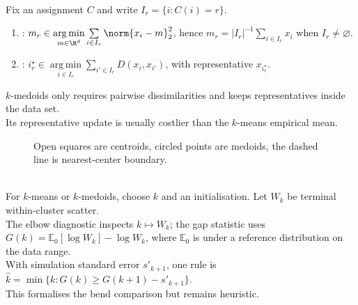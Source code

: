 \begin{remark} \label{rem:sl-kmedoids-versus-kmeans} \\
Fix an assignment $C$ and write $I_r=\{i:C(i)=r\}$.
\begin{enumerate}[label=(\roman*)]
\setlength{\itemsep}{0pt}
\item {}: $m_r\in\operatorname*{arg\,min}\limits_{m\in\R^d}\sum\limits_{i\in I_r}\norm{x_i-m}_2^2$, hence $m_r=|I_r|^{-1}\sum\limits_{i\in I_r}x_i$ when $I_r\neq\varnothing$.
\item {}: $i_r^\star\in\operatorname*{arg\,min}\limits_{i\in I_r}\sum\limits_{i'\in I_r}D(x_i,x_{i'})$, with representative $x_{i_r^\star}$.
\end{enumerate}
$k$-medoids only requires pairwise dissimilarities and keeps representatives inside the data set.\\
Its representative update is usually costlier than the $k$-means empirical mean.
\end{remark}

\begin{figure}[H]
\centering

\caption{Open squares are centroids, circled points are medoids, the dashed line is nearest-center boundary.}
\label{fig:sl-clustering-centroids-medoids}
\end{figure}

\begin{remark} \label{rem:sl-clustering-practical-choices} \\
For $k$-means or $k$-medoids, choose $k$ and an initialisation. Let $W_k$ be terminal within-cluster scatter.\\
The elbow diagnostic inspects $k\mapsto W_k$; the gap statistic uses $G(k)=\mathbb{E}_0[\log W_k]-\log W_k$, where $\mathbb{E}_0$ is under a reference distribution on the data range.\\
With simulation standard error $s'_{k+1}$, one rule is $\widehat{k}=\min\{k:G(k)\geq G(k+1)-s'_{k+1}\}$.\\
This formalises the bend comparison but remains heuristic.
\end{remark}


